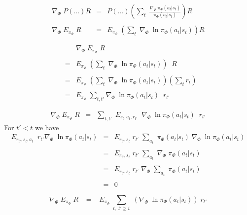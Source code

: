 {
\begin{eqnarray*}
  \nabla_\Phi \;P(\ldots)R  & = & P(\ldots) \left(\sum_t\;\frac{\nabla_\Phi\;\pi_\Phi(a_t|s_t)}{\pi_\Phi(a_t|s_t)}\right) R \\
  \\
  \nabla_\Phi \;E_{\pi_\Phi}\;R & = & E_{\pi_\Phi}\;\left(\sum_t\;\nabla_\Phi\;\ln \pi_\Phi(a_t|s_t)\right) R
\end{eqnarray*}

\begin{eqnarray*}
 & &   \nabla_\Phi \; E_{\pi_\Phi}\; R \\
  \\
  & = & E_{\pi_\Phi}\;\left(\sum_t\;\nabla_\Phi\;\ln \pi_\Phi(a_t|s_t)\right)\;\;R \\
  \\
  & = & E_{\pi_\Phi}\; \left(\sum_t\;\nabla_\Phi\;\ln \pi_\Phi(a_t|s_t)\right)\left(\sum_{t} r_{t}\right)  \\
  \\
  & = & E_{\pi_\Phi}\; \sum_{t,t'} \nabla_\Phi\;\ln \pi_\Phi(a_{t}|s_{t}) \;\;r_{t'}
\end{eqnarray*}



\begin{eqnarray*}
    \nabla_\Phi \; E_{\pi_\Phi}\; R  & = & \sum_{t,t'}\;E_{s_t,a_t,r_{t'}}\;\; \nabla_\Phi\;\ln \pi_\Phi(a_{t}|s_{t})\;\;r_{t'}
    \end{eqnarray*}
For $t' < t$ we have
{\huge
\begin{eqnarray*}
    E_{r_{t'},s_t,a_t}\;\; r_{t'} \nabla_\Phi\;\ln \pi_\Phi(a_t|s_t)  & =  & E_{r_{t'},s_t}\; r_{t'}  \;\sum_{a_t} \; \pi_\Phi(a_t|s_t)\; \nabla_\Phi\;\ln \pi_\Phi(a_t|s_t) \\
    \\
    & =  & E_{r_{t'},s_t}\; r_{t'}  \;\sum_{a_t}\; \nabla_\Phi\; \pi_\Phi(a_t|s_t) \\
    \\
    & =  & E_{r_{t'},s_t}\; r_{t'}  \;\nabla_\Phi\; \sum_{a_t}\;\pi_\Phi(a_t|s_t) \\
    \\
    & = & 0
\end{eqnarray*}
}

$$\nabla_\Phi \;E_{\pi_\Phi}\;R \;\;\; = \;\;\; E_{\pi_\Phi}\; \sum_{t,\;t' \geq t} \; \left(\nabla_\Phi\;\ln \pi_\Phi(a_t|s_t)\right) \;r_{t'}$$

}
